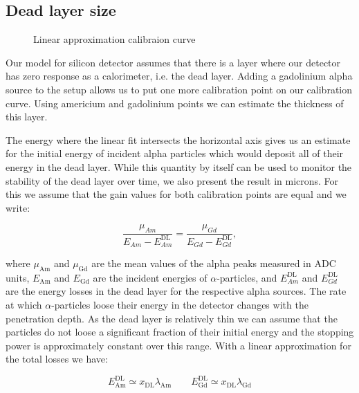 \documentclass[a4paper,12pt]{article}
\begin{document}
\subsection{Dead layer size}

\begin{figure}
\vspace{-30pt}
\begin{center}

\end{center}
\caption{Linear approximation calibraion curve}
\label{fig:calib_curve}
\end{figure}

Our model for silicon detector assumes that there is a layer where our detector
has zero response as a calorimeter, i.e. the dead layer. Adding a gadolinium alpha
source to the setup allows us to put one more calibration point on our
calibration curve. Using americium and gadolinium points we can estimate
the thickness of this layer.

The energy where the linear fit intersects the horizontal axis gives us an
estimate for the initial energy of incident alpha particles which would deposit
all of their energy in the dead layer. While this quantity by itself can be used
to monitor the stability of the dead layer over time, we also present the result
in microns. For this we assume that the gain values for both calibration points
are equal and we write:

\begin{equation}
\frac{\mu_{Am}}{E_{Am} - E^\text{DL}_{Am}} = \frac{\mu_{Gd}}{E_{Gd} - E^\text{DL}_{Gd}},
\label{eq:gain_equality}
\end{equation}

\noindent where $\mu_\text{Am}$ and $\mu_\text{Gd}$ are the mean values of the
alpha peaks measured in ADC units, $E_\text{Am}$ and $E_\text{Gd}$ are the
incident energies of $\alpha$-particles, and $E^\text{DL}_{Am}$ and
$E^\text{DL}_{Gd}$ are the energy losses in the dead layer for the respective
alpha sources. The rate at which $\alpha$-particles loose their energy in the
detector changes with the penetration depth. As the dead layer is relatively
thin we can assume that the particles do not loose a significant fraction of
their initial energy and the stopping power is approximately constant over this
range. With a linear approximation for the total losses we have:

\begin{equation}
E^\text{DL}_\text{Am} \simeq x_\text{DL} \lambda_\text{Am} \qquad
E^\text{DL}_\text{Gd} \simeq x_\text{DL} \lambda_\text{Gd}
\label{eq:linear_loss}
\end{equation}
\end{document}

